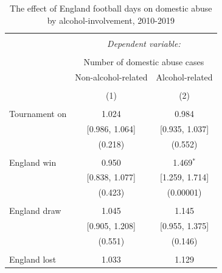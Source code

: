 \documentclass[12pt, a4paper]{article}
\begin{document}



\begin{table}[!htbp] \centering 
  \begin{threeparttable}
  \caption{The effect of England football days on domestic abuse by alcohol-involvement, 2010-2019} 
  \label{coremodel} 
\begin{tabular}{@{\extracolsep{5pt}}lcc} 
\\[-1.8ex]\hline 
\hline \\[-1.8ex] 
 & \multicolumn{2}{c}{\textit{Dependent variable:}} \\ 
\cline{2-3} 
\\[-1.8ex] & \multicolumn{2}{c}{Number of domestic abuse cases} \\ 
 & Non-alcohol-related & Alcohol-related\\ 
\\[-1.8ex] & (1) & (2)\\ 
\hline \\[-1.8ex] 
 Tournament on & 1.024 & 0.984 \\ 
  & [0.986, 1.064] & [0.935, 1.037] \\ 
  & (0.218) & (0.552) \\ 
  & & \\ 
 England win & 0.950 & 1.469$^{*}$ \\ 
  & [0.838, 1.077] & [1.259, 1.714] \\ 
  & (0.423) & (0.00001) \\ 
  & & \\ 
 England draw & 1.045 & 1.145 \\ 
  & [0.905, 1.208] & [0.955, 1.375] \\ 
  & (0.551) & (0.146) \\ 
  & & \\ 
 England lost & 1.033 & 1.129 \\ 

\end{tabular}
\end{threeparttable}
\end{table}
\end{document}
